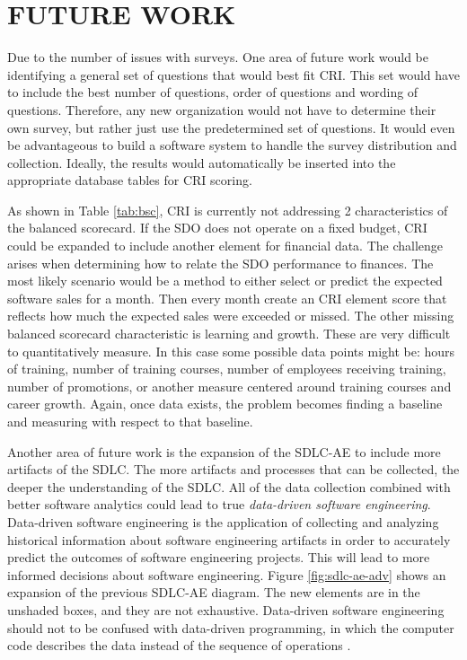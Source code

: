 \documentclass[SDSUThesis.tex]{subfiles}
\begin{document}
\section{FUTURE WORK}

    Due to the number of issues with surveys.  One area of future work would be identifying
    a general set of questions that would best fit CRI.  This set would have to include
    the best number of questions, order of questions and wording of questions.  Therefore,
    any new organization would not have to determine their own survey, but rather just use the
    predetermined set of questions.  It would even be advantageous to build a software system to
    handle the survey distribution and collection.  Ideally, the results would automatically be
    inserted into the appropriate database tables for CRI scoring. 
    
    As shown in Table \ref{tab:bsc}, CRI is currently not addressing 2 
    characteristics of the balanced scorecard.  If the SDO does not operate 
    on a fixed budget, CRI could be 
    expanded to include another element for financial data. The challenge arises when
    determining how to relate the SDO performance to finances.  The most likely scenario
    would be a method to either select or predict the expected software sales
    for a month.  Then every month create an CRI element score that reflects
    how much the expected sales were exceeded or missed.  The other missing
    balanced scorecard characteristic is learning and growth.  These are very difficult
    to quantitatively measure.  In this case some possible data points might be:
    hours of training, number of training courses, number of employees receiving
    training, number of promotions, or another measure centered around training
    courses and career growth.  Again, once data exists, the problem becomes finding
    a baseline and measuring with respect to that baseline.

    Another area of future work is the expansion of the SDLC-AE to include
    more artifacts of the SDLC.  The more artifacts and processes that can
    be collected, the deeper the understanding of the SDLC.  
    All of the data collection combined with better software analytics
    could lead to true \textit{data-driven software engineering}. Data-driven
    software engineering is the application of collecting and analyzing historical
    information about software engineering artifacts in order to
    accurately predict the outcomes of software engineering projects. This
    will lead to more informed decisions about software engineering.  Figure
    \ref{fig:sdlc-ae-adv} shows an expansion of the previous SDLC-AE diagram.  
    The new elements are in the unshaded boxes, and they are not exhaustive.
    Data-driven software engineering should 
    not to be confused with data-driven programming, in which the computer code
    describes the data instead of the sequence of operations \cite{DDP2015}.
    
\end{document}
